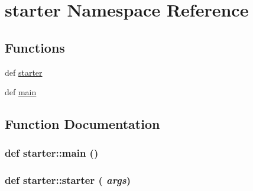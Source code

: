 \hypertarget{namespacestarter}{
\section{starter Namespace Reference}
\label{namespacestarter}
}
\subsection*{Functions}
\begin{CompactItemize}
\item 
def \hyperlink{namespacestarter_e0a0cc7ba8875c428361e4e9b1fdbe37}{starter}
\item 
def \hyperlink{namespacestarter_69dcc5f42ff248c07a8db4132c72ccc2}{main}
\end{CompactItemize}


\subsection{Function Documentation}
\hypertarget{namespacestarter_69dcc5f42ff248c07a8db4132c72ccc2}{
\subsubsection[{main}]{\setlength{\rightskip}{0pt plus 5cm}def starter::main ()}}
\label{namespacestarter_69dcc5f42ff248c07a8db4132c72ccc2}


\hypertarget{namespacestarter_e0a0cc7ba8875c428361e4e9b1fdbe37}{
\subsubsection[{starter}]{\setlength{\rightskip}{0pt plus 5cm}def starter::starter ( {\em args})}}
\label{namespacestarter_e0a0cc7ba8875c428361e4e9b1fdbe37}


